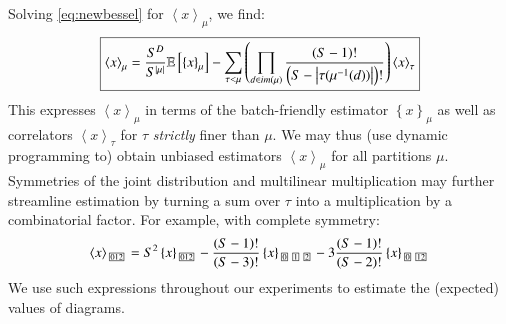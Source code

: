 \documentclass{article}
\newcommand{\expct}[1]{\mathbb{E}\left[#1\right]}
\newcommand{\wrap}[1]{\left(#1\right)}
\newcommand{\wang}[1]{\left\langle#1\right\rangle}
\newcommand{\wabs}[1]{\left|#1\right|}
\newcommand{\wurl}[1]{\left\{#1\right\}}
\newcommand{\partbox}[1]{
    \text{
        \fboxsep=0.5pt
        \tiny
        \fbox{#1}
    }
}
\begin{document}
    Solving \ref{eq:newbessel} for $\wang{x}_\mu$, we find:
    \begin{equation*}
        \text{\fbox{$
        \wang{x}_\mu
        =
        \frac{S^D}{S^{\wabs{\mu}}}
        \expct{
            \wurl{x}_\mu
        }
        -
        \sum_{\tau < \mu} \wrap{
            \prod_{d\in im(\mu)}
            \frac{\wrap{S-1}!}{\wrap{S-\wabs{\tau(\mu^{-1}(d))}}!}
        }
        \wang{x}_\tau
        $}}
    \end{equation*}
    This expresses $\wang{x}_\mu$ in terms of the batch-friendly estimator
    $\wurl{x}_\mu$ as well as correlators $\wang{x}_\tau$ for $\tau$ 
    \emph{strictly} finer than $\mu$.  We may thus (use dynamic programming to)
    obtain unbiased estimators $\wang{x}_\mu$ for all partitions $\mu$. 
    Symmetries of the joint distribution and multilinear multiplication may
    further streamline estimation by turning a sum over $\tau$ into a
    multiplication by a combinatorial factor.  For example, with complete
    symmetry:
    $$
        \wang{x}_{\partbox{012}}
        =
        S^2
        \wurl{x}_{\partbox{012}}
        -
        \frac{(S-1)!}{(S-3)!}
        \wurl{x}_{\partbox{0}\partbox{1}\partbox{2}}
        -
        3\frac{(S-1)!}{(S-2)!}
        \wurl{x}_{\partbox{0}\partbox{12}}
    $$
    We use such expressions throughout our experiments to estimate the
    (expected) values of diagrams.
\end{document}

